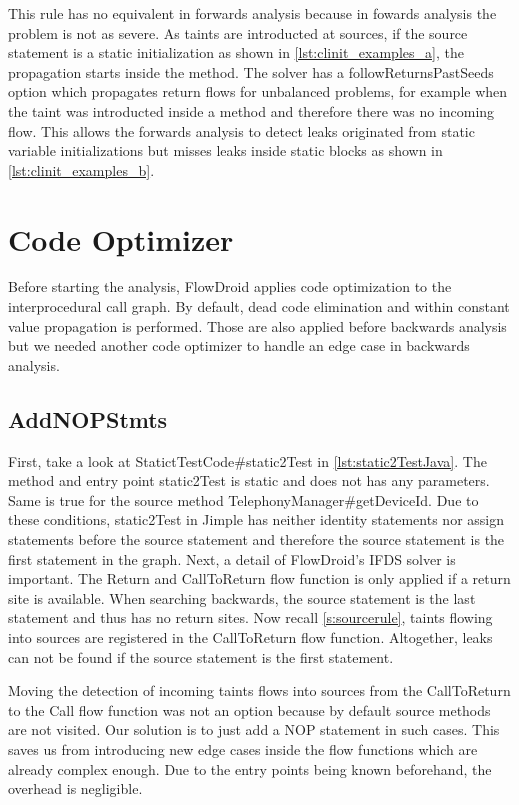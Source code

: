 \documentclass[../draft.tex]{subfiles}
\begin{document}
    This rule has no equivalent in forwards analysis because in fowards analysis the problem is not as severe. As taints are introducted at sources, if the source statement is a static initialization as shown in \autoref{lst:clinit_examples_a}, the propagation starts inside the  method. The solver has a followReturnsPastSeeds option which propagates return flows for unbalanced problems, for example when the taint was introducted inside a method and therefore there was no incoming flow. This allows the forwards analysis to detect leaks originated from static variable initializations but misses leaks inside static blocks as shown in \autoref{lst:clinit_examples_b}.

    \section{Code Optimizer}
    Before starting the analysis, FlowDroid applies code optimization to the interprocedural call graph. By default, dead code elimination and within constant value propagation is performed. Those are also applied before backwards analysis but we needed another code optimizer to handle an edge case in backwards analysis.

    \subsection{AddNOPStmts}
    First, take a look at StatictTestCode\#static2Test in \autoref{lst:static2TestJava}. The method and entry point static2Test is static and does not has any parameters. Same is true for the source method TelephonyManager\#getDeviceId. Due to these conditions, static2Test in Jimple has neither identity statements nor assign statements before the source statement and therefore the source statement is the first statement in the graph. 
    Next, a detail of FlowDroid's IFDS solver is important. The Return and CallToReturn flow function is only applied if a return site is available. When searching backwards, the source statement is the last statement and thus has no return sites. Now recall \autoref{s:sourcerule}, taints flowing into sources are registered in the CallToReturn flow function. Altogether, leaks can not be found if the source statement is the first statement.

    Moving the detection of incoming taints flows into sources from the CallToReturn to the Call flow function was not an option because by default source methods are not visited. 
    Our solution is to just add a NOP statement in such cases. This saves us from introducing new edge cases inside the flow functions which are already complex enough. Due to the entry points being known beforehand, the overhead is negligible.
\end{document}
